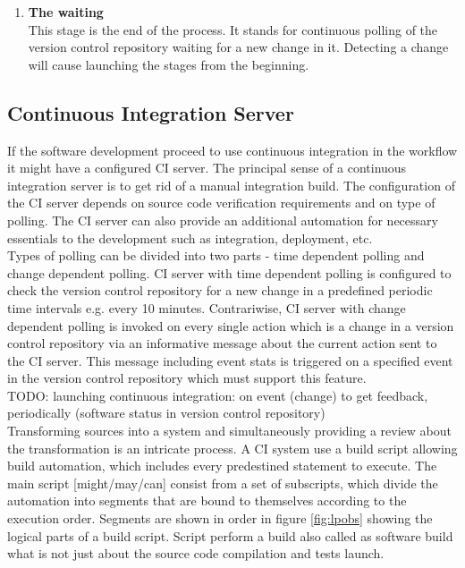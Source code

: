 \begin{enumerate}
	\item \textbf{The waiting}\\[0.1em]
		  This stage is the end of the process. It stands for continuous polling of  the version control repository waiting for a new change in it. Detecting a change will cause launching the stages from the beginning.

\end{enumerate}

\subsection{Continuous Integration Server}

If the software development proceed to use continuous integration in the workflow it might have a configured CI server. The principal sense of a continuous integration server is to get rid of a manual integration build. The configuration of the CI server depends on source code verification requirements and on type of polling. The CI server can also provide an additional automation for necessary essentials to the development such as integration, deployment, etc.\\

Types of polling can be divided into two parts - time dependent polling and change dependent polling. CI server with time dependent polling is configured to check the version control repository for a new change in a predefined periodic time intervals e.g. every 10 minutes. Contrariwise, CI server with change dependent polling is invoked on every single action which is a change in a version control repository via an informative message about the current action sent to the CI server. This message including event stats is triggered on a specified event in the version control repository which must support this feature.\\

{\color{red}TODO: launching continuous integration: on event (change) to get feedback, periodically (software status in version control repository)}\\

Transforming sources into a system and simultaneously providing a review about the transformation is an intricate process. A CI system use a build script allowing build automation, which includes every predestined statement to execute. The main script {\color{red}[might/may/can]} consist from a set of subscripts, which divide the automation into segments that are bound to themselves according to the execution order. Segments are shown in order in figure \ref{fig:lpobs} showing the logical parts of a build script. Script perform a build also called as software build what is not just about the source code compilation and tests launch.

